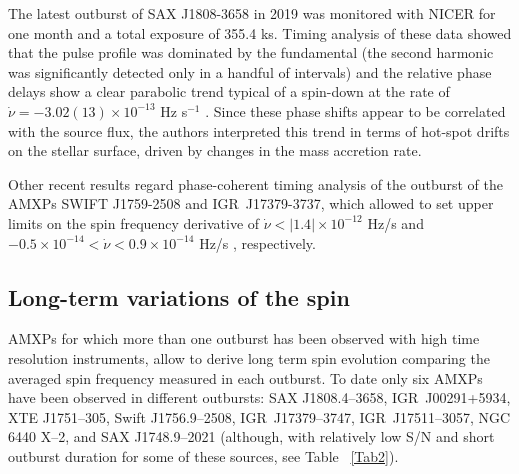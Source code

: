 \documentclass[graybox]{svmult}
\begin{document}
The latest outburst of SAX J1808-3658 in 2019 was monitored with NICER for one month and a total exposure of 355.4 ks. Timing analysis of these data showed that the pulse profile was dominated by the fundamental (the second harmonic was significantly detected only in a handful of intervals) and the relative phase delays show a clear parabolic trend typical of a spin-down at the rate of $\dot{\nu} = -3.02(13)\times 10^{-13}$ Hz s$^{-1}$ \cite{Bult2019c}. Since these phase shifts appear to be correlated with the source flux, the authors interpreted this trend in terms of hot-spot drifts on the stellar surface, driven by changes in the mass accretion rate.    

Other recent results regard phase-coherent timing analysis of the outburst of the AMXPs SWIFT J1759-2508 and IGR~J17379-3737, which allowed to set upper limits on the spin frequency derivative of $\dot{\nu}<|1.4|\times 10^{-12}$ Hz/s \cite{Sanna2019,Bult2018b} and $-0.5\times 10^{-14}<\dot{\nu}<0.9\times 10^{-14}$ Hz/s \cite{Bult2019c}, respectively.



\subsection{Long-term variations of the spin}
AMXPs for which more than one outburst has been observed with high time resolution instruments, allow to derive long term spin evolution comparing the averaged spin frequency measured in each outburst. To date only six AMXPs have been observed in different outbursts: SAX J1808.4--3658, IGR~J00291+5934, XTE J1751--305, Swift J1756.9--2508, IGR~J17379--3747, IGR~J17511--3057, NGC 6440 X--2, and SAX J1748.9--2021 (although, with relatively low S/N and short outburst duration for some of these sources, see Table ~\ref{Tab2}). 
\end{document}
